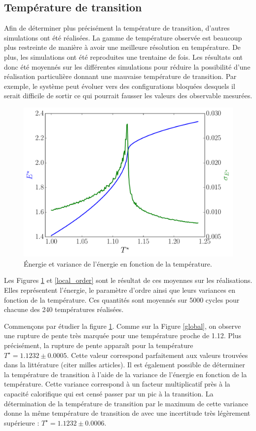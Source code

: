 \documentclass[11pt,a4paper]{article}
\numberwithin{equation}{section}
\begin{document}
\subsection{Température de transition}
Afin de déterminer plus précisément la température de transition, d'autres simulations ont été réalisées. La gamme de température observée est beaucoup plus restreinte de manière à avoir une meilleure résolution en température. De plus, les simulations ont été reproduites une trentaine de fois. Les résultats ont donc été moyennés sur les différentes simulations pour réduire la possibilité d'une réalisation particulière donnant une mauvaise température de transition.  Par exemple, le système peut évoluer vers des configurations bloquées desquels il serait difficile de sortir ce qui pourrait fausser les valeurs des observable mesurées.   

\begin{figure}[h!]
    \centering	    
	\includegraphics[scale=0.6]{figures/local_energie.pdf}
    \caption{Énergie et variance de l'énergie en fonction de la température.}
    	\label{local_energie} 
\end{figure}

Les Figures \ref{local_energie} et \ref{local_order} sont le résultat de ces moyennes sur les réalisations. Elles représentent l'énergie, le paramètre d'ordre ainsi que leurs variances en fonction de la température. Ces quantités sont moyennés sur 5000 cycles pour chacune des 240 températures réalisées.
\medskip

Commençons par étudier la figure \ref{local_energie}. Comme sur la Figure \ref{global}, on observe une rupture de pente très marquée pour une température proche de 1.12. Plus précisément, la rupture de pente apparaît pour la température $T^\star = 1.1232 \pm 0.0005$. Cette valeur correspond parfaitement aux valeurs trouvées dans la littérature (citer milles articles). Il est également possible de déterminer la température de transition à l'aide de la variance de l'énergie en fonction de la température. Cette variance correspond à un facteur multiplicatif près à la capacité calorifique qui est censé passer par un pic à la transition. La détermination de la température de transition par le maximum de cette variance donne la même température de transition de avec une incertitude très légèrement supérieure : $T^\star = 1.1232 \pm 0.0006$.
\end{document}
